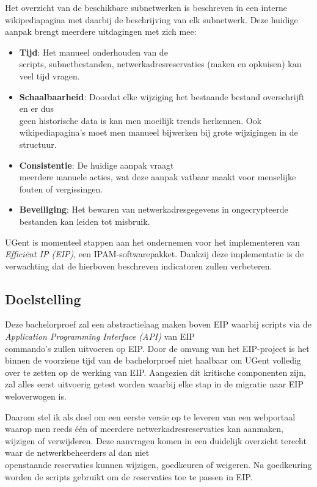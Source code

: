 \documentclass{hogent-article}
\begin{document}
Het overzicht van de beschikbare subnetwerken is beschreven in een interne wikipediapagina met daarbij de beschrijving van elk subnetwerk. Deze huidige aanpak brengt meerdere uitdagingen met zich mee:
\begin{itemize}
    \item \textbf{Tijd}: Het manueel onderhouden van de \\scripts, subnetbestanden, netwerkadresreservaties (maken en opkuisen) kan veel tijd vragen.
    \item \textbf{Schaalbaarheid}: Doordat elke wijziging het bestaande bestand overschrijft en er dus \\geen historische data is kan men moeilijk trends herkennen. Ook wikipediapagina's moet men manueel bijwerken bij grote wijzigingen in de structuur.
    \item \textbf{Consistentie}: De huidige aanpak vraagt \\meerdere manuele acties, wat deze aanpak vatbaar maakt voor menselijke fouten of vergissingen.  
    \item \textbf{Beveiliging}: Het bewaren van netwerkadresgegevens in ongecrypteerde bestanden kan leiden tot misbruik.
\end{itemize}

UGent is momenteel stappen aan het ondernemen voor het implementeren van \textit{Efficiënt IP (EIP)}, een IPAM-softwarepakket. Dankzij deze implementatie is de verwachting dat de hierboven beschreven indicatoren zullen verbeteren.

\subsection{Doelstelling}
\label{sec:doelstelling}
Deze bachelorproef zal een abstractielaag maken boven EIP waarbij scripts via de \textit{Application Programming Interface (API)} van EIP \\commando's zullen uitvoeren op EIP.
Door de omvang van het EIP-project is het binnen de voorziene tijd van de bachelorproef niet haalbaar om UGent volledig over te zetten op de werking van EIP. Aangezien dit kritische componenten zijn, zal alles eerst uitvoerig getest worden waarbij elke stap in de migratie naar EIP weloverwogen is.

Daarom stel ik als doel om een eerste versie op te leveren van een webportaal waarop men reeds één of meerdere netwerkadresreservaties kan aanmaken, wijzigen of verwijderen. Deze aanvragen komen in een duidelijk overzicht terecht waar de netwerkbeheerders al dan niet \\openstaande reservaties kunnen wijzigen, goedkeuren of weigeren. Na goedkeuring worden de scripts gebruikt om de reservaties toe te passen in EIP.
\end{document}
